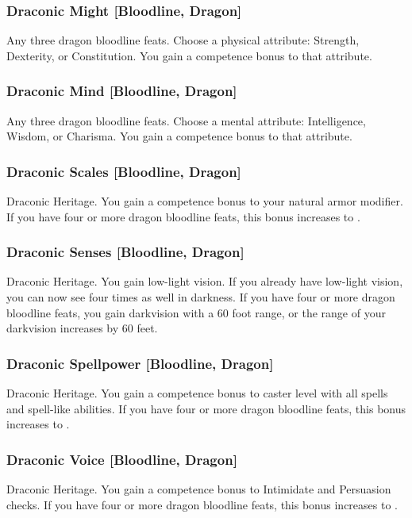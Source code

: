 \subsubsection{Draconic Might [Bloodline, Dragon]}
\featpre Any three dragon bloodline feats.
\featben Choose a physical attribute: Strength, Dexterity, or Constitution. You gain a  competence bonus to that attribute.

\subsubsection{Draconic Mind [Bloodline, Dragon]}
\featpre Any three dragon bloodline feats.
\featben Choose a mental attribute: Intelligence, Wisdom, or Charisma. You gain a  competence bonus to that attribute.

\subsubsection{Draconic Scales [Bloodline, Dragon]}
 Draconic Heritage.
 You gain a  competence bonus to your natural armor modifier. If you have four or more dragon bloodline feats, this bonus increases to .

\subsubsection{Draconic Senses [Bloodline, Dragon]}
 Draconic Heritage.
 You gain low-light vision. If you already have low-light vision, you can now see four times as well in darkness. If you have four or more dragon bloodline feats, you gain darkvision with a 60 foot range, or the range of your darkvision increases by 60 feet.

\subsubsection{Draconic Spellpower [Bloodline, Dragon]}
 Draconic Heritage.
 You gain a  competence bonus to caster level with all spells and spell-like abilities. If you have four or more dragon bloodline feats, this bonus increases to .

\subsubsection{Draconic Voice [Bloodline, Dragon]}
 Draconic Heritage.
 You gain a  competence bonus to Intimidate and Persuasion checks. If you have four or more dragon bloodline feats, this bonus increases to .

